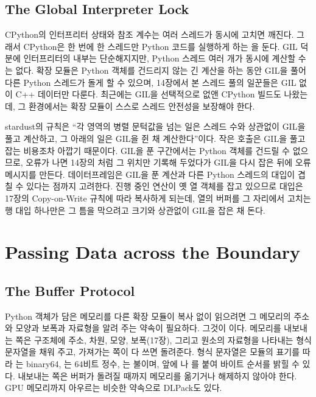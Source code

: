 \subsection{The Global Interpreter Lock}

CPython의 인터프리터 상태와 참조 계수는 여러 스레드가 동시에 고치면 깨진다. 그래서 CPython은 한 번에 한 스레드만 Python 코드를 실행하게 하는 을 둔다. GIL 덕분에 인터프리터의 내부는 단순해지지만, Python 스레드 여러 개가 동시에 계산할 수는 없다. 확장 모듈은 Python 객체를 건드리지 않는 긴 계산을 하는 동안 GIL을 풀어 다른 Python 스레드가 돌게 할 수 있으며, 14장에서 본 스레드 풀의 일꾼들은 GIL 없이 C++ 데이터만 다룬다. 최근에는 GIL을 선택적으로 없앤 CPython 빌드도 나왔는데\cite{pep703}, 그 환경에서는 확장 모듈이 스스로 스레드 안전성을 보장해야 한다.

\begin{instardust}
stardust의 규칙은 ``각 영역의 병렬 문턱값을 넘는 일은 스레드 수와 상관없이 GIL을 풀고 계산하고, 그 아래의 일은 GIL을 쥔 채 계산한다''이다. 작은 호출은 GIL을 풀고 잡는 비용조차 아깝기 때문이다. GIL을 푼 구간에서는 Python 객체를 건드릴 수 없으므로, 오류가 나면 14장의 처럼 그 위치만 기록해 두었다가 GIL을 다시 잡은 뒤에 오류 메시지를 만든다. 데이터프레임은 GIL을 푼 계산과 다른 Python 스레드의 대입이 겹칠 수 있다는 점까지 고려한다. 진행 중인 연산이 옛 열 객체를 잡고 있으므로 대입은 17장의 Copy-on-Write 규칙에 따라 복사하게 되는데, 열의 버퍼를 그 자리에서 고치는 행 대입 하나만은 그 틈을 막으려고 크기와 상관없이 GIL을 잡은 채 돈다.
\end{instardust}

\section{Passing Data across the Boundary}
\label{sec:crossing}

\subsection{The Buffer Protocol}

Python 객체가 담은 메모리를 다른 확장 모듈이 복사 없이 읽으려면 그 메모리의 주소와 모양과 보폭과 자료형을 알려 주는 약속이 필요하다. 그것이 이다\cite{pep3118}. 메모리를 내보내는 쪽은  구조체에 주소, 차원, 모양, 보폭(17장), 그리고 원소의 자료형을 나타내는 형식 문자열을 채워 주고, 가져가는 쪽이 다 쓰면 돌려준다. 형식 문자열은  모듈의 표기를 따라 는 binary64, 는 $64$비트 정수, 는 불이며, 앞에 \code{<}나 \code{>}를 붙여 바이트 순서를 밝힐 수 있다. 내보내는 쪽은 버퍼가 돌려질 때까지 메모리를 옮기거나 해제하지 않아야 한다. GPU 메모리까지 아우르는 비슷한 약속으로 DLPack도 있다\cite{dlpack}.

